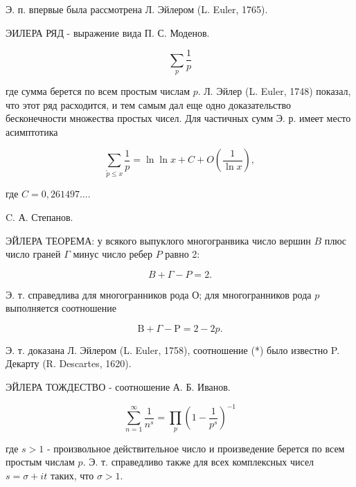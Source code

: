 \documentclass[10pt]{article}
\begin{document}
Э. п. впервые была рассмотрена Л. Эйлером (L. Euler, 1765).



ЭИЛЕРА РЯД - выражение вида П. С. Моденов.



\[

\sum_{p} \frac{1}{p}

\]



где сумма берется по всем простым числам $p$. Л. Эйлер (L. Euler, 1748) показал, что этот ряд расходится, и тем самым дал еще одно доказательство бесконечности множества простых чисел. Для частичных сумм Э. р. имеет место асимптотика



\[

\sum_{\tilde{p} \leqslant x} \frac{1}{p}=\ln \ln x+C+O\left(\frac{1}{\ln x}\right),

\]



где $C=0,261497 \ldots$.



C. А. Степанов.



ЭЙЛЕРА ТЕОРЕМА: у всякого выпуклого многогранвика число вершин $B$ плюс число граней $\Gamma$ минус число ребер $P$ равно 2:



\[

B+\Gamma-P=2 .

\]



Э. т. справедлива для многогранников рода О; для многогранников рода $p$ выполняется соотношение



\[

\mathrm{B}+\Gamma-\mathrm{P}=2-2 p .

\]



Э. т. доказана Л. Эйлером (L. Euler, 1758), соотношение (*) было известно P. Декарту (R. Descartes, 1620).



ЭЙЛЕРА ТОЖДЕСТВО - соотношение А. Б. Иванов.



\[

\sum_{n=1}^{\infty} \frac{1}{n^{s}}=\prod_{p}\left(1-\frac{1}{p^{s}}\right)^{-1}

\]



где $s>1$ - произвольное действительное число и произведение берется по всем простым числам $p$. Э. т. справедливо также для всех комплексных чисел $s=\sigma+i t$ таких, что $\sigma>1$.
\end{document}
